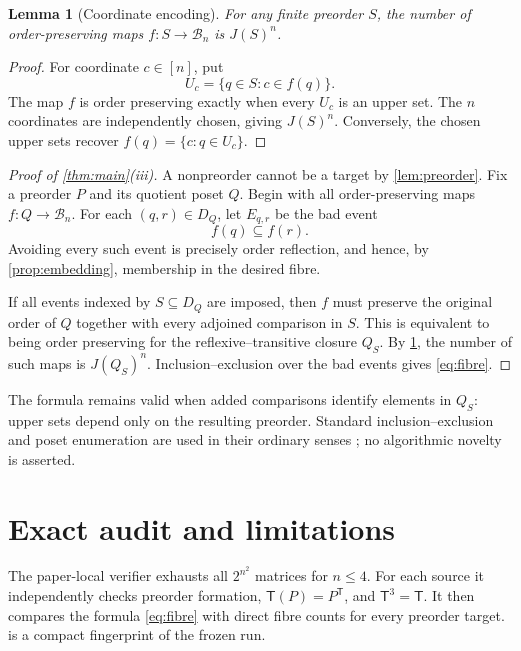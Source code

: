 \documentclass[10pt,a4paper]{amsart}
\newtheorem{lemma}[theorem]{Lemma}
\theoremstyle{definition}
\theoremstyle{remark}
\newcommand{\B}{\mathcal B}
\newcommand{\T}{\mathsf T}
\begin{document}
\begin{lemma}[Coordinate encoding]\label{lem:coordinates}
For any finite preorder $S$, the number of order-preserving maps
$f:S\to\B_n$ is $J(S)^n$.
\end{lemma}

\begin{proof}
For coordinate $c\in[n]$, put
\[
 U_c=\{q\in S:c\in f(q)\}.
\]
The map $f$ is order preserving exactly when every $U_c$ is an upper set.
The $n$ coordinates are independently chosen, giving $J(S)^n$.  Conversely,
the chosen upper sets recover $f(q)=\{c:q\in U_c\}$.
\end{proof}

\begin{proof}[Proof of \cref{thm:main}(iii)]
A nonpreorder cannot be a target by \cref{lem:preorder}.  Fix a preorder
$P$ and its quotient poset $Q$.  Begin with all order-preserving maps
$f:Q\to\B_n$.  For each $(q,r)\in D_Q$, let $E_{q,r}$ be the bad event
\[
                             f(q)\subseteq f(r).
\]
Avoiding every such event is precisely order reflection, and hence, by
\cref{prop:embedding}, membership in the desired fibre.

If all events indexed by $S\subseteq D_Q$ are imposed, then $f$ must preserve
the original order of $Q$ together with every adjoined comparison in $S$.
This is equivalent to being order preserving for the reflexive--transitive
closure $Q_S$.  By \cref{lem:coordinates}, the number of such maps is
$J(Q_S)^n$.  Inclusion--exclusion over the bad events gives \eqref{eq:fibre}.
\end{proof}

The formula remains valid when added comparisons identify elements in
$Q_S$: upper sets depend only on the resulting preorder.  Standard
inclusion--exclusion and poset enumeration are used in their ordinary senses
\cite{Stanley2012}; no algorithmic novelty is asserted.

\section{Exact audit and limitations}

The paper-local verifier exhausts all $2^{n^2}$ matrices for $n\leq4$.  For
each source it independently checks preorder formation,
$\T(P)=P^{\mathsf T}$, and $\T^3=\T$.  It then compares the formula
\eqref{eq:fibre} with direct fibre counts for every preorder target.
 is a compact fingerprint of the frozen run.
\end{document}

